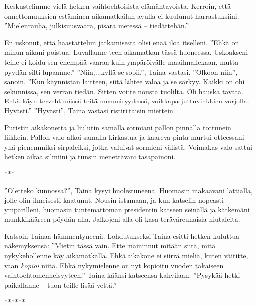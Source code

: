 ﻿\documentclass[a4paper, 12pt, finnish]{article}
\newcommand{\q}[1]{''#1''}  %
\begin{document}
Keskustelimme vielä hetken vaihtoehtoisista elämäntavoista.
Kerroin, että onnettomuuksien estäminen aikamatkailun
avulla ei kuulunut harrastuksiini. \q{Mielenrauha, julkisuusvaara,
pisara meressä -- tiedättehän.}

En uskonut, että haastattelun jatkamisesta olisi enää iloa itselleni.
\q{Ehkä on minun aikani poistua. Luvallanne teen aikamatkan tässä
huoneessa. Uskoakseni teille ei koidu sen enempää vaaraa kuin
ympäröivälle maailmallekaan, mutta pyydän silti lupaanne.}
\q{Niin,...kyllä se sopii.}, Taina vastasi.
\q{Olkoon niin}, sanoin. \q{Kun käynnistän laitteen, siitä lähtee
valoa ja se särkyy. Kaikki on ohi sekunnissa, sen verran tiedän.
Sitten voitte nousta tuolilta. Oli hauska tavata.
Ehkä käyn tervehtimässä teitä menneisyydessä,
vaikkapa juttuvinkkien varjolla. Hyvästi.}
\q{Hyvästi}, Taina vastasi ristiriitaisin miettein.

Puristin aikakonetta ja liu'utin samalla sormiani pallon pinnalla
tottunein liikkein. Pallon valo alkoi samalla kirkastua ja kaareva
pinta murtui otteessani yhä pienemmiksi sirpaleiksi,
jotka valuivat sormieni välistä. Voimakas valo sattui hetken aikaa
silmiini ja tunsin menettäväni tasapainoni.

***

\q{Oletteko kunnossa?}, Taina kysyi huolestuneena. Huomasin makaavani
lattialla, jolle olin ilmeisesti kaatunut. Nousin istumaan, ja
kun katselin nopeasti ympärilleni, huomasin tuntemattoman
presidentin katseen seinällä ja kätkemäni munkkikääreen pöydän alla.
Jalkojeni alla oli kasa teräväreunaisia hiutaleita.

Katsoin Tainaa hämmentyneenä. Lohdutukseksi Taina esitti hetken
kuluttua näkemyksensä: \q{Mietin tässä vain.
Ette maininnut mitään siitä, mitä nykykehollenne käy aikamatkalla.
Ehkä aikakone ei siirrä mieliä, kuten väititte,
vaan \emph{kopioi} niitä. Ehkä nykymielenne on nyt kopioitu
vuoden takaiseen vaihtoehtomenneisyyteen.}
Taina käänsi katseensa kahvilaan:
\q{Pysykää hetki paikallanne -- tuon teille lisää vettä.}

******
\end{document}
